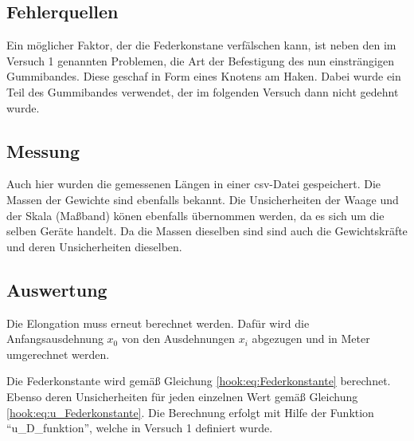 \documentclass[
  9pt,
]{article}
\begin{document}
\hypertarget{fehlerquellen-1}{%
\subsection{Fehlerquellen}\label{fehlerquellen-1}}

Ein möglicher Faktor, der die Federkonstane verfälschen kann, ist neben
den im Versuch 1 genannten Problemen, die Art der Befestigung des nun
einsträngigen Gummibandes. Diese geschaf in Form eines Knotens am Haken.
Dabei wurde ein Teil des Gummibandes verwendet, der im folgenden Versuch
dann nicht gedehnt wurde.

\hypertarget{messung-1}{%
\subsection{Messung}\label{messung-1}}

Auch hier wurden die gemessenen Längen in einer csv-Datei gespeichert.
Die Massen der Gewichte sind ebenfalls bekannt. Die Unsicherheiten der
Waage und der Skala (Maßband) könen ebenfalls übernommen werden, da es
sich um die selben Geräte handelt. Da die Massen dieselben sind sind
auch die Gewichtskräfte und deren Unsicherheiten dieselben.

\hypertarget{auswertung}{%
\subsection{Auswertung}\label{auswertung}}

Die Elongation muss erneut berechnet werden. Dafür wird die
Anfangsausdehnung \(x_0\) von den Ausdehnungen \(x_i\) abgezugen und in
Meter umgerechnet werden.

Die Federkonstante wird gemäß Gleichung \ref{hook:eq:Federkonstante}
berechnet. Ebenso deren Unsicherheiten für jeden einzelnen Wert gemäß
Gleichung \ref{hook:eq:u_Federkonstante}. Die Berechnung erfolgt mit
Hilfe der Funktion ``u\_D\_funktion'', welche in Versuch 1 definiert
wurde.
\end{document}
